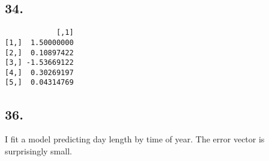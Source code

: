 \documentclass[]{article}
\newenvironment{Shaded}{\begin{snugshade}}{\end{snugshade}}
\newcommand{\DecValTok}[1]{\textcolor[rgb]{0.00,0.00,0.81}{#1}}
\newcommand{\FloatTok}[1]{\textcolor[rgb]{0.00,0.00,0.81}{#1}}
\newcommand{\KeywordTok}[1]{\textcolor[rgb]{0.13,0.29,0.53}{\textbf{#1}}}
\newcommand{\NormalTok}[1]{#1}
\newcommand{\OperatorTok}[1]{\textcolor[rgb]{0.81,0.36,0.00}{\textbf{#1}}}
\newcommand{\StringTok}[1]{\textcolor[rgb]{0.31,0.60,0.02}{#1}}
\begin{document}
\hypertarget{section-17}{%
\subsection{34.}\label{section-17}}

\begin{Shaded}
\end{Shaded}

\begin{verbatim}
            [,1]
[1,]  1.50000000
[2,]  0.10897422
[3,] -1.53669122
[4,]  0.30269197
[5,]  0.04314769
\end{verbatim}

\hypertarget{section-18}{%
\subsection{36.}\label{section-18}}

I fit a model predicting day length by time of year. The error vector is
surprisingly small.
\end{document}
